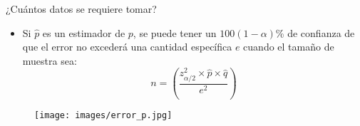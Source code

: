 \begin{frame}{¿Cuántos datos se requiere tomar?}
    \begin{itemize}
        \item Si $\hat{p}$ es un estimador de $p$, se puede tener un $100\left(1-\alpha\right)$\% de confianza de que el error no excederá una cantidad específica $e$ cuando el tamaño de muestra sea:
        \[n=\left(\dfrac{z^2_{\alpha/2}\times \hat{p} \times \hat{q}}{e^2}\right)\]
    \end{itemize}
    \begin{figure}
        \centering
        \texttt{[image: images/error\_p.jpg]}
    \end{figure}
\end{frame}